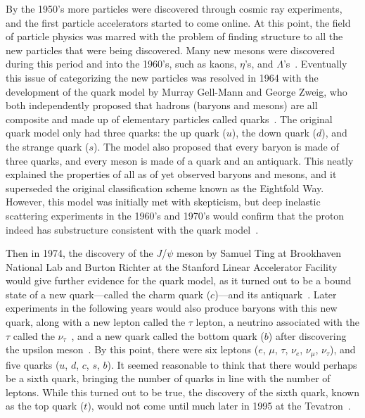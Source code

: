 By the 1950's more particles were discovered through cosmic ray experiments, and the first particle accelerators started to come online.
At this point, the field of particle physics was marred with the problem of finding structure to all the new particles that were being discovered.
Many new mesons were discovered during this period and into the 1960's, such as kaons, $\eta$'s, and $\Lambda$'s~\cite{CosmicRay,PhysRevLett.7.421}.
Eventually this issue of categorizing the new particles was resolved in 1964 with the development of the quark model by Murray Gell-Mann and George Zweig, who both independently proposed that hadrons (baryons and mesons) are all composite and made up of elementary particles called quarks~\cite{Gellmann1964214,Zweig:1981pd}.
The original quark model only had three quarks: the up quark ($u$), the down quark ($d$), and the strange quark ($s$).
The model also proposed that every baryon is made of three quarks, and every meson is made of a quark and an antiquark.
This neatly explained the properties of all as of yet observed baryons and mesons, and it superseded the original classification scheme known as the Eightfold Way.
However, this model was initially met with skepticism, but deep inelastic scattering experiments in the 1960's and 1970's would confirm that the proton indeed has substructure consistent with the quark model~\cite{PhysRevLett.23.930,cernQuarks}.

Then in 1974, the discovery of the $J$/$\psi$ meson by Samuel Ting at Brookhaven National Lab and Burton Richter at the Stanford Linear Accelerator Facility would give further evidence for the quark model, as it turned out to be a bound state of a new quark---called the charm quark ($c$)---and its antiquark~\cite{PhysRevLett.33.1406,PhysRevLett.33.1404}.
Later experiments in the following years would also produce baryons with this new quark, along with a new lepton called the $\tau$ lepton, a neutrino associated with the $\tau$ called the $\nu_\tau$~\cite{Perl:1976rz}, and a new quark called the bottom quark ($b$) after discovering the upsilon meson~\cite{1977PhRvL..39..252H}.
By this point, there were six leptons ($e$, $\mu$, $\tau$, $\nu_e$, $\nu_\mu$, $\nu_\tau$), and five quarks ($u$, $d$, $c$, $s$, $b$).
It seemed reasonable to think that there would perhaps be a sixth quark, bringing the number of quarks in line with the number of leptons.
While this turned out to be true, the discovery of the sixth quark, known as the top quark ($t$), would not come until much later in 1995 at the Tevatron~\cite{PhysRevLett.74.2626}.

